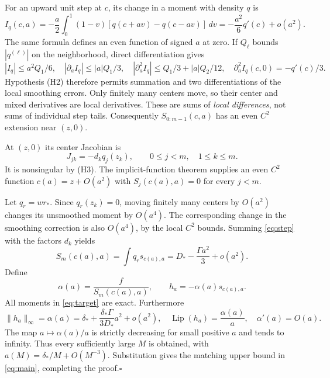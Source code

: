 \documentclass[11pt,a4paper]{article}
\numberwithin{equation}{section}
\theoremstyle{remark}\newtheorem{remark}[theorem]{Remark}
\DeclareMathOperator{\Lip}{Lip}
\newcommand{\ds}{\delta_*}
\newcommand{\Ds}{D_*}
\newcommand{\rs}{r_*}
\newcommand{\norm}[1]{\lVert#1\rVert}
\begin{document}
For an upward unit step at $c$, its change in a moment with density $q$ is
\begin{equation}
 I_q(c,a)=-\frac a2\int_0^1(1-v)[q(c+av)-q(c-av)]\,dv
 =-\frac{a^2}{6}q'(c)+o(a^2).\label{eq:step}
\end{equation}
The same formula defines an even function of signed $a$ at zero. If
$Q_\ell$ bounds $|q^{(\ell)}|$ on the neighborhood, direct differentiation
gives
\begin{equation}
 |I_q|\le a^2Q_1/6,\quad
 |\partial_a I_q|\le |a|Q_1/3,\quad
 |\partial_a^2 I_q|\le Q_1/3+|a|Q_2/12,\quad
 \partial_a^2I_q(c,0)=-q'(c)/3.\label{eq:c2bounds}
\end{equation}
Hypothesis (H2) therefore permits summation and two differentiations of
the local smoothing errors. Only finitely many centers move, so their
center and mixed derivatives are local derivatives. These are sums of
\emph{local differences}, not sums of individual step tails. Consequently
$S_{0:m-1}(c,a)$ has an even $C^2$ extension near $(z,0)$.

At $(z,0)$ its center Jacobian is
\begin{equation}
 J_{jk}=-d_kq_j(z_k),\qquad 0\le j<m,\quad1\le k\le m.\label{eq:centerJ}
\end{equation}
It is nonsingular by (H3). The implicit-function theorem supplies an even
$C^2$ function $c(a)=z+O(a^2)$ with
$S_j(c(a),a)=0$ for every $j<m$.

Let $q_r=w\rs$. Since $q_r(z_k)=0$, moving finitely many centers by
$O(a^2)$ changes its unsmoothed moment by $O(a^4)$. The corresponding
change in the smoothing correction is also $O(a^4)$, by the local $C^2$
bounds. Summing \eqref{eq:step} with the factors $d_k$ yields
\begin{equation}
 S_m(c(a),a)=\int q_rs_{c(a),a}
 =\Ds-\frac{\Gamma a^2}{3}+o(a^2).\label{eq:Sm}
\end{equation}
Define
\begin{equation}
 \alpha(a)=\frac f{S_m(c(a),a)},\qquad h_a=-\alpha(a)s_{c(a),a}.
\end{equation}
All moments in \eqref{eq:target} are exact. Furthermore
\begin{equation}
 \norm{h_a}_\infty=\alpha(a)
 =\ds+\frac{\ds\Gamma}{3\Ds}a^2+o(a^2),\quad
 \Lip(h_a)=\frac{\alpha(a)}a,\quad\alpha'(a)=O(a).
\end{equation}
The map $a\mapsto\alpha(a)/a$ is strictly decreasing for small positive
$a$ and tends to infinity. Thus every sufficiently large $M$ is obtained,
with $a(M)=\ds/M+O(M^{-3})$. Substitution gives the matching upper bound
in \eqref{eq:main}, completing the proof.\hfill$\square$
\end{document}
